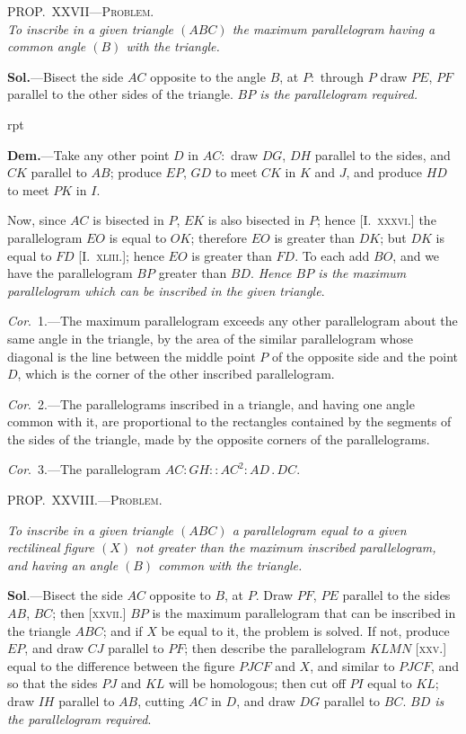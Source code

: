 \documentclass[oneside]{book}
\newcommand\myprop[2]{
\bigskip\Needspace*{4\baselineskip}\begin{center}\textsc{#1}\\\medskip\emph{#2}\par\end{center}
}
\newcommand\mypropl[2]{
\bigskip\Needspace*{4\baselineskip}\begin{center}\textsc{#1}\end{center}
\hspace{\parindent}\emph{#2}\par\medskip
}
\newcommand\imgflow[3]{
\setcounter{wrapwidth}{#1}
\begin{wrapfigure}[#2]{r}{\value{wrapwidth}pt}
\begin{center}
\vspace{-0.3in}
\end{center}
\end{wrapfigure}
}
\begin{document}
\myprop{PROP\@.~XXVII---Problem.}{To inscribe in a given triangle $(ABC)$ the maximum
parallelogram having a common angle $(B)$ with the triangle.}

\textbf{Sol.}---Bisect the side $AC$ opposite to the angle $B$, at
$P:$ through $P$ draw $PE$, $PF$ parallel to the other sides
of the triangle. \emph{$BP$ is the parallelogram required.}

\imgflow{140}{8}{f207}

\textbf{Dem.}---Take any other point $D$ in $AC:$ draw $DG$,
$DH$ parallel to the sides, and $CK$ parallel to $AB$;
produce $EP$, $GD$ to meet
$CK$ in $K$ and $J$, and produce $HD$ to meet $PK$ in $I$.

Now, since $AC$ is bisected
in $P$, $EK$ is also bisected
in $P$; hence [I.~\textsc{xxxvi.}] the
parallelogram $EO$ is equal
to $OK$; therefore $EO$ is
greater than $DK$; but $DK$ is equal to $FD$ [I.~\textsc{xliii.}];
hence $EO$ is greater than $FD$. To each add $BO$, and
we have the parallelogram $BP$ greater than $BD$.
\emph{Hence $BP$ is the maximum parallelogram which can be
inscribed in the given triangle}.

\emph{Cor}.~1.---The maximum parallelogram exceeds any
other parallelogram ab\-out the same angle in the triangle,
by the area of the similar parallelogram whose
diagonal is the line between the middle point $P$ of the
opposite side and the point $D$, which is the corner of
the other inscribed parallelogram.

\emph{Cor}.~2.---The parallelograms inscribed in a triangle,
and having one angle common with it, are proportional
to the rectangles contained by the segments of the
sides of the triangle, made by the opposite corners of
the parallelograms.

\emph{Cor}.~3.---The parallelogram $AC : GH :: AC^2 :
AD\,.\,DC$.

\mypropl{PROP\@.~XXVIII\@.---Problem.}{To inscribe in a given triangle $(ABC)$ a parallelogram
equal to a given rectilineal figure $(X)$ not greater than
the maximum inscribed parallelogram, and having an
angle $(B)$ common with the triangle.}

\textbf{Sol}.---Bisect the side $AC$ opposite to $B$, at $P$. Draw
$PF$, $PE$ parallel to the sides $AB$, $BC$; then [\textsc{xxvii}.] $BP$ is
the maximum parallelogram that can be inscribed in the
triangle $ABC$; and if $X$ be equal to it, the problem is
solved. If not, produce $EP$, and draw $CJ$ parallel to
$PF$; then describe the parallelogram $KLMN$ [\textsc{xxv.}]
equal to the difference between the figure $PJCF$ and
$X$, and similar to $PJCF$, and so that the sides $PJ$ and
$KL$ will be homologous; then cut off $PI$ equal to $KL$;
draw $IH$ parallel to $AB$, cutting $AC$ in $D$, and draw
$DG$ parallel to $BC$. \emph{$BD$ is the parallelogram required}.
\end{document}
